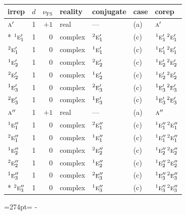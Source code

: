 \documentclass[10pt,a4paper]{article}
\newcommand{\needspace}[1]{\par\penalty-100\begingroup\dimen0=#1\relax\dimen2=\pagegoal
  \advance\dimen2-\pagetotal\ifdim\dimen0>\dimen2\relax\ifdim\dimen2>0pt\vfil\break\fi\fi
  \endgroup}
\numberwithin{equation}{section}
\newcommand{\irr}[1]{\text{\normalfont\scshape #1}}
\newcommand{\conjpair}[1]{{}^{#1}}
\newcommand{\fsind}{\nu_{\mathrm{FS}}}
\begin{document}
{\small\renewcommand{\arraystretch}{1.25}\setlength{\tabcolsep}{4pt}\begin{longtable}{@{}lrrllll@{}}\toprule
irrep & $d$ & $\fsind$ & reality & conjugate & case & corep\\\midrule\endhead
\bottomrule\endfoot\endlastfoot
$\irr{a}'$ & 1 & $+1$ & real & --- & (a) & $\irr{a}'$\\*
$\conjpair{1}\irr{e}_{1}'$ & 1 & $0$ & complex & $\conjpair{2}\irr{e}_{1}'$ & (c) & $\conjpair{1}\irr{e}_{1}'\,\conjpair{2}\irr{e}_{1}'$\\
$\conjpair{2}\irr{e}_{1}'$ & 1 & $0$ & complex & $\conjpair{1}\irr{e}_{1}'$ & (c) & $\conjpair{1}\irr{e}_{1}'\,\conjpair{2}\irr{e}_{1}'$\\
$\conjpair{1}\irr{e}_{2}'$ & 1 & $0$ & complex & $\conjpair{2}\irr{e}_{2}'$ & (c) & $\conjpair{1}\irr{e}_{2}'\,\conjpair{2}\irr{e}_{2}'$\\
$\conjpair{2}\irr{e}_{2}'$ & 1 & $0$ & complex & $\conjpair{1}\irr{e}_{2}'$ & (c) & $\conjpair{1}\irr{e}_{2}'\,\conjpair{2}\irr{e}_{2}'$\\
$\conjpair{1}\irr{e}_{3}'$ & 1 & $0$ & complex & $\conjpair{2}\irr{e}_{3}'$ & (c) & $\conjpair{1}\irr{e}_{3}'\,\conjpair{2}\irr{e}_{3}'$\\
$\conjpair{2}\irr{e}_{3}'$ & 1 & $0$ & complex & $\conjpair{1}\irr{e}_{3}'$ & (c) & $\conjpair{1}\irr{e}_{3}'\,\conjpair{2}\irr{e}_{3}'$\\
$\irr{a}''$ & 1 & $+1$ & real & --- & (a) & $\irr{a}''$\\
$\conjpair{1}\irr{e}_{1}''$ & 1 & $0$ & complex & $\conjpair{2}\irr{e}_{1}''$ & (c) & $\conjpair{1}\irr{e}_{1}''\,\conjpair{2}\irr{e}_{1}''$\\
$\conjpair{2}\irr{e}_{1}''$ & 1 & $0$ & complex & $\conjpair{1}\irr{e}_{1}''$ & (c) & $\conjpair{1}\irr{e}_{1}''\,\conjpair{2}\irr{e}_{1}''$\\
$\conjpair{1}\irr{e}_{2}''$ & 1 & $0$ & complex & $\conjpair{2}\irr{e}_{2}''$ & (c) & $\conjpair{1}\irr{e}_{2}''\,\conjpair{2}\irr{e}_{2}''$\\
$\conjpair{2}\irr{e}_{2}''$ & 1 & $0$ & complex & $\conjpair{1}\irr{e}_{2}''$ & (c) & $\conjpair{1}\irr{e}_{2}''\,\conjpair{2}\irr{e}_{2}''$\\
$\conjpair{1}\irr{e}_{3}''$ & 1 & $0$ & complex & $\conjpair{2}\irr{e}_{3}''$ & (c) & $\conjpair{1}\irr{e}_{3}''\,\conjpair{2}\irr{e}_{3}''$\\*
$\conjpair{2}\irr{e}_{3}''$ & 1 & $0$ & complex & $\conjpair{1}\irr{e}_{3}''$ & (c) & $\conjpair{1}\irr{e}_{3}''\,\conjpair{2}\irr{e}_{3}''$\\
\bottomrule\end{longtable}}
\needspace{274pt}
\end{document}
